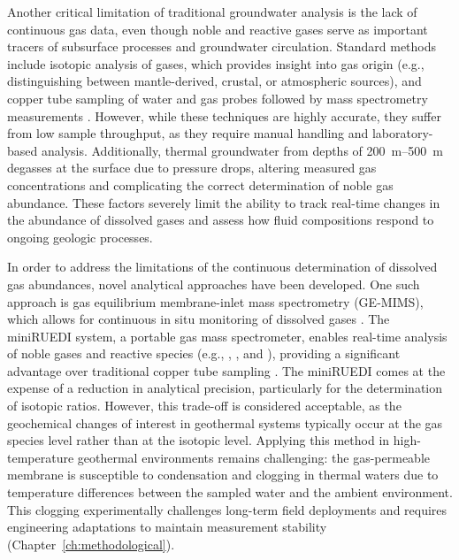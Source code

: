 Another critical limitation of traditional groundwater analysis is the lack of continuous gas data, even though noble and reactive gases serve as important tracers of subsurface processes and groundwater circulation.
Standard methods include isotopic analysis of gases, which provides insight into gas origin (e.g., distinguishing between mantle-derived, crustal, or atmospheric sources), and copper tube sampling of water and gas probes followed by mass spectrometry measurements \citep{beyerle2000mass}.
However, while these techniques are highly accurate, they suffer from low sample throughput, as they require manual handling and laboratory-based analysis.
Additionally, thermal groundwater from depths of \SIrange{200}{500}{\metre} degasses at the surface due to pressure drops, altering measured gas concentrations and complicating the correct determination of noble gas abundance.
These factors severely limit the ability to track real-time changes in the abundance of dissolved gases and assess how fluid compositions respond to ongoing geologic processes.

In order to address the limitations of the continuous determination of dissolved gas abundances, novel analytical approaches have been developed.
One such approach is gas equilibrium membrane-inlet mass spectrometry (GE-MIMS), which allows for continuous in situ monitoring of dissolved gases \citep{maechler2012miniruedi}.
The miniRUEDI system, a portable gas mass spectrometer, enables real-time analysis of noble gases and reactive species (e.g., , , and ), providing a significant advantage over traditional copper tube sampling \citep{brennwald2016portable}.
The miniRUEDI comes at the expense of a reduction in analytical precision, particularly for the determination of isotopic ratios.
However, this trade-off is considered acceptable, as the geochemical changes of interest in geothermal systems typically occur at the gas species level rather than at the isotopic level.
Applying this method in high-temperature geothermal environments remains challenging: the gas-permeable membrane is susceptible to condensation and clogging in thermal waters due to temperature differences between the sampled water and the ambient environment.
This clogging experimentally challenges long-term field deployments and requires engineering adaptations to maintain measurement stability (Chapter~\ref{ch:methodological}).

